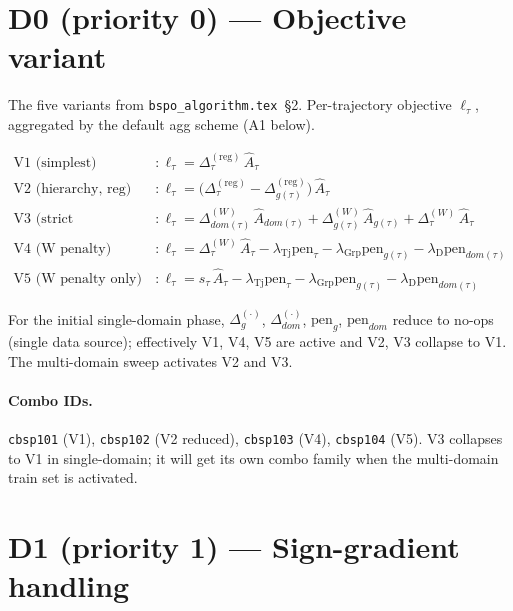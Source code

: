 \documentclass[11pt]{article}
\begin{document}
\section{D0 (priority 0) --- Objective variant}
\label{sec:d0}

The five variants from \texttt{bspo\_algorithm.tex}~\S2. Per-trajectory
objective $\ell_\tau$, aggregated by the default agg scheme (A1 below).

\begin{align*}
\text{V1 (simplest)}       &: \ell_\tau = \Delta_\tau^{(\text{reg})}\,\hat A_\tau \\
\text{V2 (hierarchy, reg)} &: \ell_\tau = \bigl(\Delta_\tau^{(\text{reg})} - \Delta_{g(\tau)}^{(\text{reg})}\bigr)\,\hat A_\tau \\
\text{V3 (strict Wasserstein)} &: \ell_\tau =
  \Delta_{dom(\tau)}^{(W)}\,\hat A_{dom(\tau)}
  + \Delta_{g(\tau)}^{(W)}\,\hat A_{g(\tau)}
  + \Delta_\tau^{(W)}\,\hat A_\tau \\
\text{V4 (W penalty)} &: \ell_\tau = \Delta_\tau^{(W)}\,\hat A_\tau
  - \lambda_{\operatorname{Tj}}\mathrm{pen}_\tau
  - \lambda_{\operatorname{Grp}}\mathrm{pen}_{g(\tau)}
  - \lambda_{\text{D}}\mathrm{pen}_{dom(\tau)} \\
\text{V5 (W penalty only)} &: \ell_\tau = s_\tau\,\hat A_\tau
  - \lambda_{\operatorname{Tj}}\mathrm{pen}_\tau
  - \lambda_{\operatorname{Grp}}\mathrm{pen}_{g(\tau)}
  - \lambda_{\text{D}}\mathrm{pen}_{dom(\tau)}
\end{align*}

For the initial single-domain phase, $\Delta_g^{(\cdot)}$,
$\Delta_{dom}^{(\cdot)}$, $\mathrm{pen}_g$, $\mathrm{pen}_{dom}$ reduce
to no-ops (single data source); effectively V1, V4, V5 are active and
V2, V3 collapse to V1. The multi-domain sweep activates V2 and V3.

\paragraph{Combo IDs.}
\verb|cbsp101| (V1), \verb|cbsp102| (V2 reduced), \verb|cbsp103| (V4),
\verb|cbsp104| (V5). V3 collapses to V1 in single-domain; it will get
its own combo family when the multi-domain train set is activated.

\section{D1 (priority 1) --- Sign-gradient handling}
\label{sec:d1}
\end{document}
